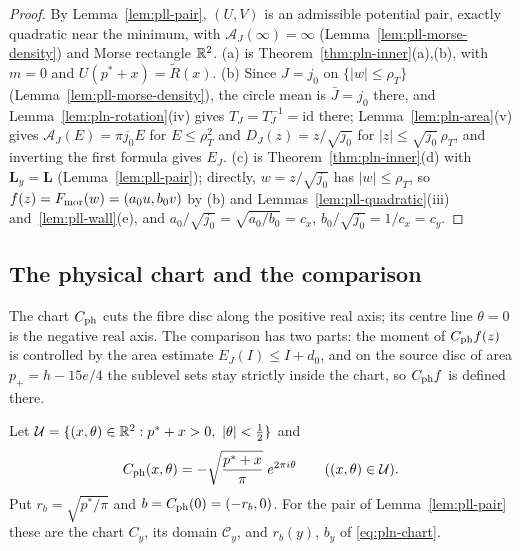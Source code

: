 \begin{proof}
By Lemma~\ref{lem:pll-pair}, $(U,V)$ is an admissible potential pair, exactly quadratic near the minimum, with
$\mathcal A_J(\infty)=\infty$ (Lemma~\ref{lem:pll-morse-density}) and Morse rectangle $\mathbb{R}^2$. (a) is
Theorem~\ref{thm:pln-inner}(a),(b), with $m=0$ and $U(p^*+x)=\tilde R(x)$. (b) Since $J=j_0$ on $\{|w|\le\rho_T\}$
(Lemma~\ref{lem:pll-morse-density}), the circle mean is $\bar J=j_0$ there, and Lemma~\ref{lem:pln-rotation}(iv) gives
$T_J=T_J^{-1}=\mathrm{id}$ there; Lemma~\ref{lem:pln-area}(v) gives $\mathcal A_J(E)=\pi j_0E$ for $E\le\rho_T^2$ and
$D_J(z)=z/\sqrt{j_0}$ for $|z|\le\sqrt{j_0}\,\rho_T$, and inverting the first formula gives $E_J$. (c) is
Theorem~\ref{thm:pln-inner}(d) with $\mathbf L_y=\mathbf L$ (Lemma~\ref{lem:pll-pair}); directly, $w=z/\sqrt{j_0}$
has $|w|\le\rho_T$, so $f(z)=F_{\rm mor}(w)=(a_0u,b_0v)$ by (b) and Lemmas~\ref{lem:pll-quadratic}(iii)
and~\ref{lem:pll-wall}(e), and $a_0/\sqrt{j_0}=\sqrt{a_0/b_0}=c_x$, $b_0/\sqrt{j_0}=1/c_x=c_y$.
\end{proof}

\subsection{The physical chart and the comparison}\label{sec:pll-chart}

The chart $C_{\rm ph}$ cuts the fibre disc along the positive real axis; its centre line $\theta=0$ is the negative
real axis. The comparison has two parts: the moment of $C_{\rm ph}f(z)$ is controlled by the area estimate
$E_J(I)\le I+d_0$, and on the source disc of area $p_+=h-15e/4$ the sublevel sets stay strictly inside the chart, so
$C_{\rm ph}f$ is defined there.

\begin{definition}\label{def:pll-chart}
Let $\mathcal U=\{(x,\theta)\in\R^2:p^*+x>0,\ |\theta|<\tfrac12\}$ and
\begin{equation}\label{eq:pll-chart}
 C_{\rm ph}(x,\theta)=-\sqrt{\frac{p^*+x}{\pi}}\;e^{2\pi i\theta}\qquad((x,\theta)\in\mathcal U).
\end{equation}
Put $r_b=\sqrt{p^*/\pi}$ and $b=C_{\rm ph}(0)=(-r_b,0)$. For the pair of Lemma~\ref{lem:pll-pair} these are the chart
$C_y$, its domain $\mathcal C_y$, and $r_b(y)$, $b_y$ of \eqref{eq:pln-chart}.
\end{definition}

